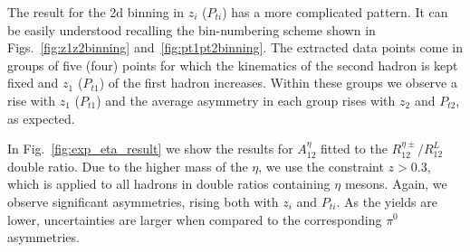 The result for the 2d binning in \(z_{i}\) (\(P_{ti}\)) has a more complicated pattern. It can be easily understood recalling the bin-numbering scheme shown in Figs.~\ref{fig:z1z2binning} and~\ref{fig:pt1pt2binning}. The extracted data points come in groups of five (four) points for which the kinematics of the second hadron is kept fixed and $z_1$ ($P_{t1}$) of the first hadron increases. Within these groups we observe a rise with $z_1$ ($P_{t1}$) and the average asymmetry in each group rises with $z_2$ and $P_{t2}$, as expected.


In Fig.~\ref{fig:exp_eta_result} we show the results for $A_{12}^{\eta}$ fitted to the $R_{12}^{\eta \pm}/R_{12}^L$ double ratio. Due to the higher mass of the $\eta$, we use the constraint $z> 0.3$, which is applied to all hadrons in double ratios containing $\eta$ mesons. Again, we observe significant asymmetries, rising both with \(z_i\) and \(P_{ti}\).  As the yields are lower, uncertainties are larger when compared to the corresponding $\pi^0$ asymmetries. 
